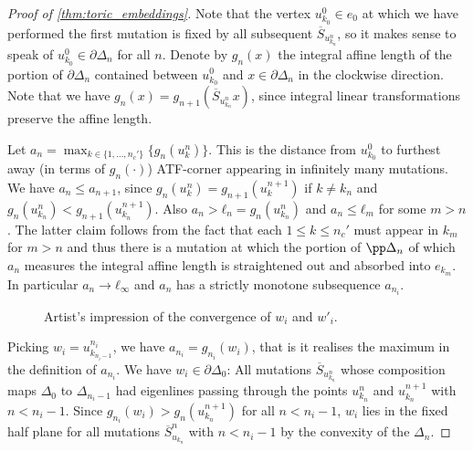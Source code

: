 \documentclass[12pt,a4paper,draft]{scrartcl}
\begin{document}
\begin{proof}[Proof of \cref{thm:toric_embeddings}]
  Note that the vertex $u_{k_0}^0 ∈ e_0$ at which we have performed the first mutation is fixed by all subsequent $\overline{S}_{u_{k_n}^n}$, so it makes sense to speak of $u_{k_0}^0 ∈ ∂Δ_n$ for all $n$.
  Denote by $g_n(x)$ the integral affine length of the portion of $\partial \Delta_n$ contained between $u_{k_0}^0$ and $x ∈ ∂Δ_n$ in the clockwise direction. Note that we have $g_n(x) = g_{n+1}(\overline{S}_{u_{k_n}^n}x)$, since integral linear transformations preserve the affine length.

  Let $a_n = \max_{k ∈\{1,…,n_c'\}} \{g_n(u_k^n)\}$. This is the distance from $u_{k_0}^0$ to furthest away (in terms of $g_n(\cdot)$) ATF-corner appearing in infinitely many mutations. We have $a_n ≤ a_{n+1}$, since $g_n(u_k^n) = g_{n+1}(u_k^{n+1})$ if $k ≠ k_n$ and $g_n(u_{k_n}^n) < g_{n+1}(u_{k_n}^{n+1})$.
Also $a_n > ℓ_n = g_n(u_{k_n}^n)$ and $a_n ≤ ℓ_m$ for some $m>n$. The latter claim follows from the fact that each $1 ≤ k ≤ n_c'$ must appear in $k_{m}$ for $m>n$ and thus there is a mutation at which the portion of $\pp \Delta_n$ of which $a_n$ measures the integral affine length is straightened out and absorbed into $e_{k_m}$.
  In particular $a_n → ℓ_∞$ and $a_n$ has a strictly monotone subsequence $a_{n_i}$.

  \begin{figure}
    \centering
    \caption{Artist's impression of the convergence of $w_i$ and $w'_i$.}
    \label{fig:stretch_wi}
  \end{figure}
  
  Picking $w_i = u_{k_{n_i -1}}^{n_i}$, we have $a_{n_i} = g_{n_i}(w_i)$, that is it realises the maximum in the definition of $a_{n_i}$.
  We have $w_i ∈ ∂Δ_0$: All mutations $\overline{S}_{u_{k_n}^n}$ whose composition maps $Δ_0$ to $Δ_{n_i-1}$ had eigenlines passing through the points $u_{k_n}^n$ and $u_{k_n}^{n+1}$ with $n<n_i-1$.
Since $g_{n_i}(w_i) > g_n(u_{k_n}^{n+1})$ for all $n<n_i-1$, $w_i$ lies in the fixed half plane  for all mutations $\overline{S}_{u_{k_n}}^n$ with $n< n_i-1$ by the convexity of the $Δ_n$.


\end{proof}
\end{document}
